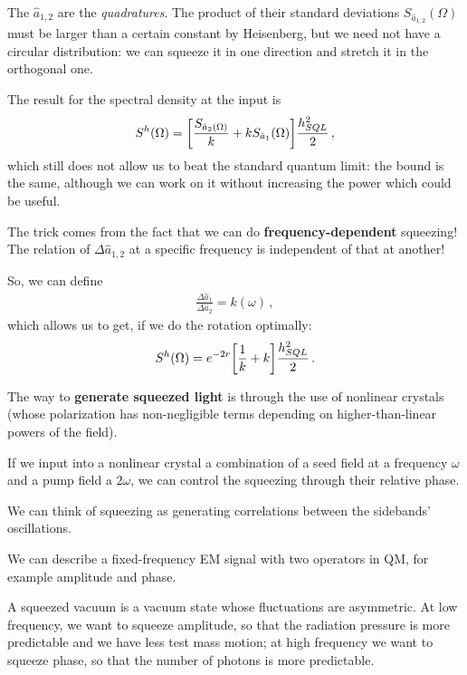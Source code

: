 \documentclass[main.tex]{subfiles}
\begin{document}
The \(\hat{a}_{1, 2}\) are the \emph{quadratures}. The product of their standard deviations \(S_{\hat{a}_{1, 2}} (\Omega )\) must be larger than a certain constant by Heisenberg, but we need not have a circular distribution: we can squeeze it in one direction and stretch it in the orthogonal one. 

The result for the spectral density at the input is 
%
\begin{align}
S^{h} (\Omega ) = \qty[\frac{S_{\hat{a}_2 (\Omega )}}{k} + k S_{\hat{a}_{1}} (\Omega )]\frac{h^2_{SQL}}{2}
\,,
\end{align}
%
which still does not allow us to beat the standard quantum limit: the bound is the same, although we can work on it without increasing the power which could be useful. 

The trick comes from the fact that we can do \textbf{frequency-dependent} squeezing! The relation of \(\Delta \hat{a}_{1, 2}\) at a specific frequency is independent of that at another! 

So, we can define 
%
\begin{align}
\frac{\Delta \hat{a}_{1}}{\Delta \hat{a}_{2}} = k(\omega )
\,,
\end{align}
%
which allows us to get, if we do the rotation optimally:
%
\begin{align}
S^{h} (\Omega ) =   e^{-2r} \qty[ \frac{1}{k} + k] \frac{h^2_{SQL}}{2}
\,.
\end{align}

The way to \textbf{generate squeezed light} is through the use of nonlinear crystals (whose polarization has non-negligible terms depending on higher-than-linear powers of the field). 

If we input into a nonlinear crystal a combination of a seed field at a frequency \(\omega \) and a pump field a \(2 \omega \), we can control the squeezing through their relative phase.  

We can think of squeezing as generating correlations between the sidebands' oscillations. 

We can describe a fixed-frequency EM signal with two operators in QM, for example amplitude and phase. 

A squeezed vacuum is a vacuum state whose fluctuations are asymmetric. 
At low frequency, we want to squeeze amplitude, so that the radiation pressure is more predictable and we have less test mass motion; at high frequency we want to squeeze phase, so that the number of photons is more predictable. 

 
\end{document}
